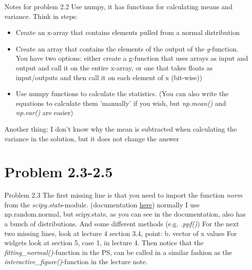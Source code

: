 \documentclass[10pt,danish,t,10pt]{beamer}
\newcommand{\code}[1]{\textit{#1}} %
\begin{document}
\begin{frame}{Notes for problem 2.2}
    Use numpy, it has functions for calculating means and variance. \newline Think in steps: 
    \begin{itemize}
        \item Create an x-array that contains elements pulled from a normal distribution
        \item Create an array that contains the elements of the output of the \code{g}-function. You have two options: either create a g-function that uses arrays as input and output and call it on the entire x-array, or one that takes floats as input/outputs and then call it on each element of x (bit-wise))
        \item Use numpy functions to calculate the statistics. (You can also write the equations to calculate them 'manually' if you wish, but \code{np.mean()} and \code{np.var()} are easier)
    \end{itemize}
    Another thing: I don't know why the mean is subtracted when calculating the variance in the solution, but it does not change the answer
\end{frame}
\section{Problem 2.3-2.5}
\begin{frame}{Problem 2.3}
    The first missing line is that you need to import the function \code{norm} from the \code{scipy.stats}-module. (documentation \href{https://docs.scipy.org/doc/scipy/reference/stats.html}{\underline{here}}) normally I use np.random.normal, but scipy.stats, as you can see in the documentation, also has a bunch of distributions. And some different methods (e.g. \code{.ppf()}) \newline
    For the next two missing lines, look at lecture 4 section 3.4, point: b. vector of x values \newline
    For widgets look at section 5, case 1, in lecture 4. Then notice that the \code{fitting\_normal()}-function in the PS, can be called in a similar fashion as the \code{interactive\_figure()}-function in the lecture note.
\end{frame}
\end{document}
